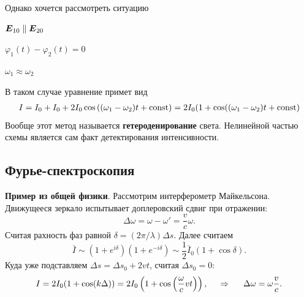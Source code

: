 \noindent
Однако хочется рассмотреть ситуацию

$\mbox{\boldmath $E$}_{10} \parallel \mbox{\boldmath $E$}_{20}$ 

$\varphi_1(t) - \varphi_2 (t) = 0$

$\omega_1 \approx \omega_2$

\noindent
В таком случае уравнение примет вид
\begin{align*}
    I = I_0 + I_0 + 2 I_0 \cos \left(
        (\omega_1 - \omega_2) t + \text{const}
    \right) = 2 I_0 (1 + \cos((\omega_1 - \omega_2)t + \text{const})
\end{align*}
Вообще этот метод называется \textbf{гетероденирование} света. Нелинейной частью схемы является сам факт детектирования интенсивности. 

% 





\subsection{Фурье-спектроскопия}


\textbf{Пример из общей физики}. 
Рассмотрим интерферометр Майкельсона. Движущееся зеркало испытывает доплеровский сдвиг при отражении:
\begin{equation*}
   \Delta \omega = \omega   -\omega' = \frac{v}{c}\omega.
\end{equation*}
Считая рахность фаз равной $\delta = (2\pi/\lambda) \Delta s$. Далее считаем
\begin{equation*}
    \bar{I} \sim (1 + e^{i \delta})(1 + e^{-i\delta}) \sim \frac{1}{2} \bar{I}_0 (1 + \cos \delta).
\end{equation*}
Куда уже подставляем $\Delta s = \Delta s_0 + 2 v t$, считая $\Delta s_0 = 0$:
\begin{equation*}
    I = 2 I_0 (1 + \cos (k \Delta)) = 2 I_0 \left( 1 + \cos \left(
            \frac{\omega}{c} v t
        \right)\right),
        \hspace{0.5cm} \Rightarrow \hspace{0.5cm}
        \Delta \omega = \omega \frac{v}{c}.
\end{equation*}

